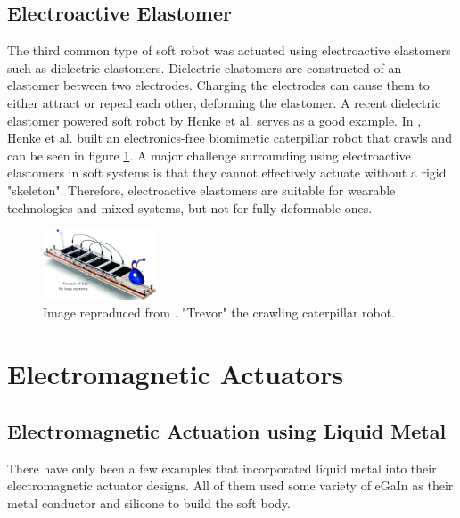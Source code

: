 \documentclass[a4paper,12pt]{article}
\begin{document}
\subsection{Electroactive Elastomer}
The third common type of soft robot was actuated using electroactive elastomers such as dielectric elastomers. Dielectric elastomers are constructed of an elastomer between two electrodes. Charging the electrodes can cause them to either attract or repeal each other, deforming the elastomer. A recent dielectric elastomer powered soft robot by Henke et al. \cite{henkeSoftDielectricElastomer2017} serves as a good example. In \cite{henkeSoftDielectricElastomer2017}, Henke et al. built an electronics-free biomimetic caterpillar robot that crawls and can be seen in figure \ref{fg:catepillar}. A major challenge surrounding using electroactive elastomers in soft systems is that they cannot effectively actuate without a rigid "skeleton". Therefore, electroactive elastomers are suitable for wearable technologies and mixed systems, but not for fully deformable ones.

\begin{figure}[h!]
    \centering
    \includegraphics[width=0.3\textwidth]{catepillar.png}
    \caption{Image reproduced from \cite{henkeSoftDielectricElastomer2017}. "Trevor" the crawling caterpillar robot.}
    \label{fg:catepillar}
\end{figure}

\section{Electromagnetic Actuators}

\subsection{Electromagnetic Actuation using Liquid Metal}
There have only been a few examples that incorporated liquid metal into their electromagnetic actuator designs. All of them used some variety of eGaIn as their metal conductor and silicone to build the soft body.
\end{document}
